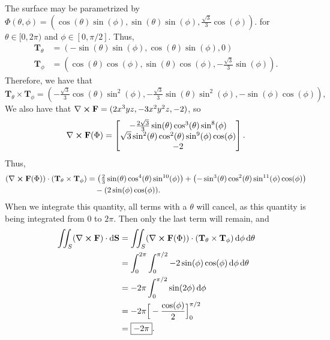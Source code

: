\documentclass[11pt]{article}
\renewcommand{\vec}[1]{\mathbf{#1}}
\renewcommand{\curl}{\nabla \cross}
\begin{document}
The surface may be parametrized by $\Phi(\theta, \phi) = \left( \cos(\theta)\sin(\phi), \sin(\theta)\sin(\phi), \tfrac{\sqrt{3}}{3} \cos(\phi) \right)$. for $\theta \in [0, 2\pi)$ and $\phi \in [0, \pi/2]$. Thus, 
\begin{align*}
	\mathbf{T}_{\theta} &= (-\sin(\theta)\sin(\phi), \cos(\theta)\sin(\phi), 0) \\
	\mathbf{T}_{\phi} &= \left( \cos(\theta)\cos(\phi), \sin(\theta)\cos(\phi), -\tfrac{\sqrt{3}}{3} \sin(\phi) \right).
\end{align*}
Therefore, we have that
\[
	\mathbf{T}_{\theta} \times \mathbf{T}_{\phi} = \left( -\tfrac{\sqrt{3}}{3} \cos(\theta)\sin^{2}(\phi), -\tfrac{\sqrt{3}}{3} \sin(\theta) \sin^{2}(\phi), -\sin(\phi)\cos(\phi) \right),
\]
We also have that $\curl \mathbf{F} = (2x^{3}yz, -3x^{2}y^{2}z, -2)$, so
\[
	\curl \mathbf{F} (\Phi) = \begin{bmatrix} -\tfrac{2\sqrt{3}}{3}  \sin(\theta) \cos^{3}(\theta)\sin^{8}(\phi) \\ \sqrt{3} \sin^{2}(\theta)\cos^{2}(\theta)\sin^{9}(\phi)\cos(\phi) \\ -2 \end{bmatrix}.
\]
Thus, 
\begin{align*}
	(\curl \mathbf{F}(\Phi)) \cdot (\mathbf{T}_{\theta} \times \mathbf{T}_{\phi}) &= \left( \tfrac{2}{3} \sin(\theta) \cos^{4}(\theta) \sin^{10}(\phi) \right) + \left( -\sin^{3}(\theta) \cos^{2}(\theta) \sin^{11}(\phi)\cos(\phi) \right) \\
	& \quad - (2 \sin(\phi)\cos(\phi)).
\end{align*}
When we integrate this quantity, all terms with a $\theta$ will cancel, as this quantity is being integrated from $0$ to $2\pi$. Then only the last term will remain, and 
\begin{align*}
	\iint_{S} (\curl \mathbf{F}) \cdot \dd{\vec{S}} &= \iint_{S} (\curl \mathbf{F}(\Phi)) \cdot (\mathbf{T}_{\theta} \times \mathbf{T}_{\phi}) \dd{\phi} \dd{\theta} \\
	&= \int_{0}^{2\pi} \int_{0}^{\pi/2} -2\sin(\phi)\cos(\phi) \dd{\phi} \dd{\theta} \\
	&= -2\pi \int_{0}^{\pi/2} \sin(2\phi) \dd{\phi} \\
	&= -2 \pi \Big[ -\frac{\cos(\phi)}{2} \Big]_{0}^{\pi/2} \\
	&= \boxed{-2\pi}.
\end{align*}

\newpage

\end{document}
